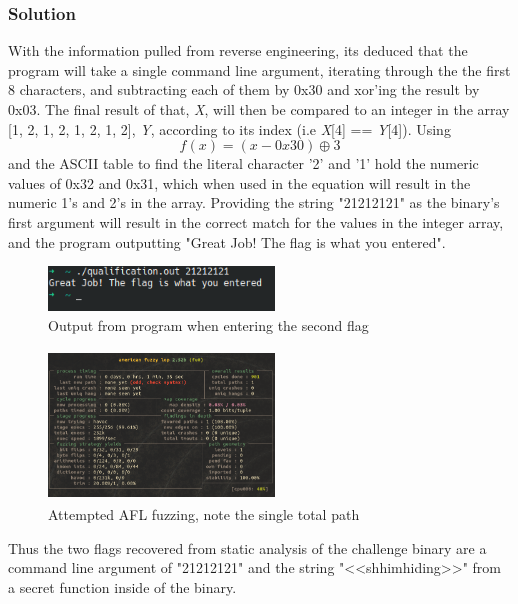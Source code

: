 \documentclass[conference]{IEEEtran}
\begin{document}
\subsubsection{Solution}

With the information pulled from reverse engineering, its deduced that the program will take a single command line argument, iterating through the the first 8 characters, and subtracting each of them by 0x30 and xor'ing the result by 0x03. The final result of that, \textit{X}, will then be compared to an integer in the array [1, 2, 1, 2, 1, 2, 1, 2], \textit{Y}, according to its index (i.e \textit{X}[4] == \textit{Y}[4]). Using
\begin{equation}
    f(x) = (x - 0x30) \oplus 3
\end{equation} 
and the ASCII table to find the literal character '2' and '1' hold the numeric values of 0x32 and 0x31, which when used in the equation will result in the numeric 1's and 2's in the array. Providing the string "21212121" as the binary's first argument will result in the correct match for the values in the integer array, and the program outputting "Great Job! The flag is what you entered". 

\begin{figure}
    \centering
    \includegraphics[width=6cm]{solution.png}
    \caption{Output from program when entering the second flag}
    \label{fig:my_label}
\end{figure}

\begin{figure}
    \centering
    \includegraphics[width=6cm, height=4cm]{afl.png}
    \caption{Attempted AFL fuzzing, note the single total path}
    \label{fig:my_label}
\end{figure}

Thus the two flags recovered from static analysis of the challenge binary are a command line argument of "21212121" and the string "<<shhimhiding>>" from a secret function inside of the binary. 
\end{document}
